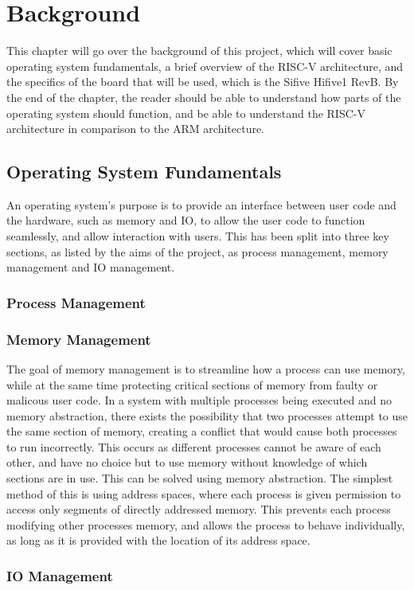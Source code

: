 \chapter[Background]{Background}
\label{cha:backgr}
This chapter will go over the background of this project, which will cover basic operating system fundamentals, a brief overview of the RISC-V architecture, and the specifics of the board that will be used, which is the Sifive Hifive1 RevB. By the end of the chapter, the reader should be able to understand how parts of the operating system should function, and be able to understand the RISC-V architecture in comparison to the ARM architecture.
\section{Operating System Fundamentals}
An operating system's purpose is to provide an interface between user code and the hardware, such as memory and IO, to allow the user code to function seamlessly, and allow interaction with users. This has been split into three key sections, as listed by the aims of the project, as process management, memory management and IO management.\cite{modern_operating}
\subsection{Process Management}

\subsection{Memory Management}
The goal of memory management is to streamline how a process can use memory, while at the same time protecting critical sections of memory from faulty or malicous user code. In a system with multiple processes being executed and no memory abstraction, there exists the possibility that two processes attempt to use the same section of memory, creating a conflict that would cause both processes to run incorrectly. This occurs as different processes cannot be aware of each other, and have no choice but to use memory without knowledge of which sections are in use. This can be solved using memory abstraction. The simplest method of this is using address spaces, where each process is given permission to access only segments of directly addressed memory. This prevents each process modifying other processes memory, and allows the process to behave individually, as long as it is provided with the location of its address space.
\subsection{IO Management}
